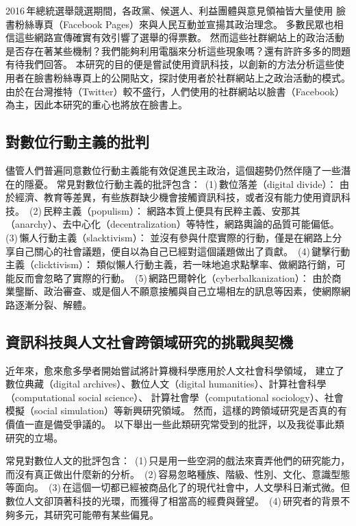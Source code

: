 \documentclass[letterpaper, 10pt, conference]{ieeeconf}   %
\begin{document}
\begin{CJK*}{UTF8}{bsmi}
2016\,年總統選舉競選期間，各政黨、候選人、利益團體與意見領袖皆大量使用
臉書粉絲專頁（Facebook Pages）來與人民互動並宣揚其政治理念。
多數民眾也相信這些網路宣傳確實有效引響了選舉的得票數。
然而這些社群網站上的政治活動是否存在著某些機制？我們能夠利用電腦來分析這些現象嗎？還有許許多多的問題有待我們回答。
本研究的目的便是嘗試使用資訊科技，以創新的方法分析這些使用者在臉書粉絲專頁上的公開貼文，探討使用者於社群網站上之政治活動的模式。
由於在台灣推特（Twitter）較不盛行，人們使用的社群網站以臉書（Facebook）為主，因此本研究的重心也將放在臉書上。

\subsection*{對數位行動主義的批判}

儘管人們普遍同意數位行動主義能有效促進民主政治，這個趨勢仍然伴隨了一些潛在的隱憂。
常見對數位行動主義的批評包含：
\,(1)\,數位落差（digital divide）：
由於經濟、教育等差異，有些族群缺少機會接觸資訊科技，或者沒有能力使用資訊科技。
\,(2)\,民粹主義（populism）：
網路本質上便具有民粹主義、安那其（anarchy）、去中心化（decentralization）等特性，網路輿論的品質可能偏低。
\,(3)\,懶人行動主義（slacktivism）：
並沒有參與什麼實際的行動，僅是在網路上分享自己關心的社會議題，便自以為自己已經對這個議題做出了貢獻。
\,(4)\,鍵擊行動主義（clicktivism）：
類似懶人行動主義，若一味地追求點擊率、做網路行銷，可能反而會忽略了實際的行動。
\,(5)\,網路巴爾幹化（cyberbalkanization）：
由於商業壟斷、政治審查、或是個人不願意接觸與自己立場相左的訊息等因素，使網際網路逐漸分裂、解體。

\subsection*{資訊科技與人文社會跨領域研究的挑戰與契機}

近年來，愈來愈多學者開始嘗試將計算機科學應用於人文社會科學領域，
建立了數位典藏（digital archives）、數位人文（digital humanities）、計算社會科學（computational social science）、
計算社會學（computational sociology）、社會模擬（social simulation）等新興研究領域。
然而，這樣的跨領域研究是否真的有價值一直是備受爭議的。
以下舉出一些此類研究常受到的批評，以及我從事此類研究的立場。

常見對數位人文的批評包含：
\,(1)\,只是用一些空洞的戲法來賣弄他們的研究能力，而沒有真正做出什麼新的分析。
\,(2)\,容易忽略種族、階級、性別、文化、意識型態等面向。
\,(3)\,在這個一切都已經被商品化了的現代社會中，人文學科日漸式微。但數位人文卻頂著科技的光環，而獲得了相當高的經費與聲望。
\,(4)\,研究者的背景不夠多元，其研究可能帶有某些偏見。


\end{CJK*}
\end{document}

